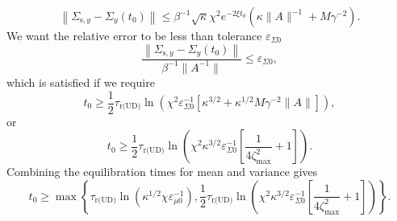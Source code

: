 \documentclass[prx,onecolumn,floatfix,longbibliography,notitlepage, nofootinbib]{revtex4-1}
\renewcommand{\geq}{\geqslant}
\renewcommand{\leq}{\leqslant}
\begin{document}
\begin{appendix}
\begin{equation}
    \left\|\Sigma_{\text{s},y} - \Sigma_{y}(t_0)\right\| \leq \beta^{-1}
   \sqrt{\kappa}\chi^2 e^{- 2\xi t_0 }\left(\kappa\|A\|^{-1}+M \gamma^{-2}\right).
\end{equation}
We want the relative error to be less than tolerance $\varepsilon_{\Sigma0}$
\begin{equation}
    \frac{\left\|\Sigma_{\text{s},y} - \Sigma_{y}(t_0)\right\|}{\beta^{-1} \|A^{-1}\|}\leq \varepsilon_{\Sigma0},
\end{equation}
which is satisfied if we require
\begin{equation}
    t_0 \geq \frac{1}{2} \tau_\text{r(UD)}\ln\left(\chi^2 \varepsilon_{\Sigma0}^{-1}\left[\kappa^{3/2}+\kappa^{1/2}M \gamma^{-2} \|A\|\right]\right),
\end{equation}
or
\begin{equation}
    t_0 \geq \frac{1}{2} \tau_\text{r(UD)}\ln\left(\chi^2 \kappa^{3/2}\varepsilon_{\Sigma0}^{-1}\left[\frac{1}{4\zeta_\text{max}^{2}}+1\right]\right).
\end{equation}
Combining the equilibration times for mean and variance gives
\begin{equation}
t_0 \geq \max \left\{ \tau_{\text{r(UD)}} \ln \left( \kappa^{1/2}\chi \varepsilon_{\mu 0}^{-1}\right),\frac{1}{2} \tau_\text{r(UD)}\ln\left(\chi^2 \kappa^{3/2}\varepsilon_{\Sigma0}^{-1}\left[\frac{1}{4\zeta_\text{max}^{2}}+1\right]\right)\right\}.
\end{equation}


\end{appendix}
\end{document}
